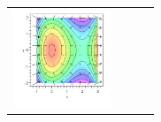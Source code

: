 \begin{center}
\renewcommand{\mywidth}{1.15in}
\begin{tabular}{cccc}
\includegraphics[width=\mywidth]{08-Optimization/support/levelcurve-1}
 

\end{tabular}
\end{center}
